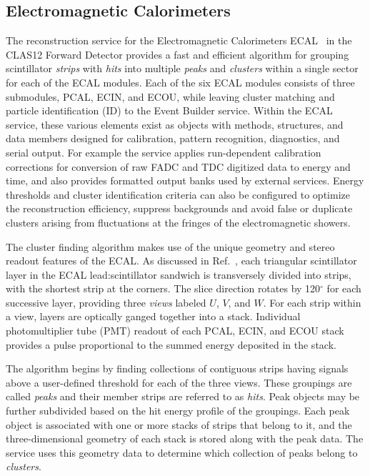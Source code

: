 \subsection{Electromagnetic Calorimeters}

The reconstruction service for the Electromagnetic Calorimeters ECAL~\cite{ecal-nim} in the CLAS12 Forward
Detector provides a fast and efficient algorithm for grouping scintillator {\it strips} with {\it hits} into multiple
{\it peaks} and {\it clusters} within a single sector for each of the ECAL modules. Each of the six ECAL modules
consists of three submodules, PCAL, ECIN, and ECOU, while leaving cluster matching and particle identification
(ID) to the Event Builder service. Within the ECAL service, these various elements exist as objects with methods,
structures, and data members designed for calibration, pattern recognition, diagnostics, and serial output. For
example the service applies run-dependent calibration corrections for conversion of raw FADC and TDC digitized
data to energy and time, and also provides formatted output banks used by external services.  Energy thresholds
and cluster identification criteria can also be configured to optimize the reconstruction efficiency, suppress
backgrounds and avoid false or duplicate clusters arising from fluctuations at the fringes of the electromagnetic
showers.

The cluster finding algorithm makes use of the unique geometry and stereo readout features of the ECAL. As
discussed in Ref.~\cite{ecal-nim}, each triangular scintillator layer in the ECAL lead:scintillator sandwich is
transversely divided into strips, with the shortest strip at the corners. The slice direction rotates by 120$^\circ$
for each successive layer, providing three {\it views} labeled $U$, $V$, and $W$.  For each strip within a view,
layers are optically ganged together into a stack.  Individual photomultiplier tube (PMT) readout of each PCAL, ECIN,
and ECOU stack provides a pulse proportional to the summed energy deposited in the stack.

The algorithm begins by finding collections of contiguous strips having signals above a user-defined threshold for
each of the three views. These groupings are called {\it peaks} and their member strips are referred to as
{\it hits}.  Peak objects may be further subdivided based on the hit energy profile of the groupings. Each peak
object is associated with one or more stacks of strips that belong to it, and the three-dimensional geometry of each
stack is stored along with the peak data. The service uses this geometry data to determine which collection of
peaks belong to {\it clusters}.

